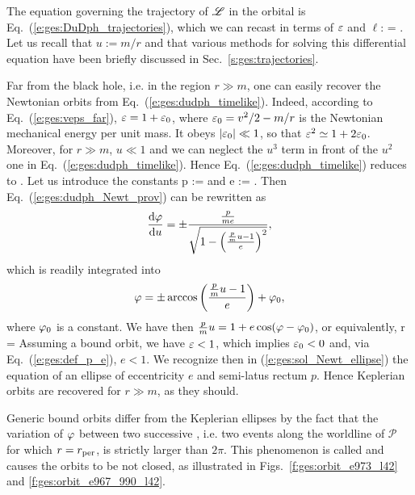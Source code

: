 The equation governing the trajectory of $\mathscr{L}$ in the orbital is
Eq.~(\ref{e:ges:DuDph_trajectories}), which we can recast in terms
of $\varepsilon$ and $\ell$:
\be  \label{e:ges:dudph_timelike}
      = \pm {} .
\ee
Let us recall that $u := m/r$ and that various methods for solving this
differential equation have been briefly discussed in Sec.~\ref{s:ges:trajectories}.

\begin{remark}
Far from the black hole, i.e. in the region $r\gg m$, one can easily recover
the Newtonian orbits from Eq.~(\ref{e:ges:dudph_timelike}). Indeed, according to
Eq.~(\ref{e:ges:veps_far}), $\varepsilon = 1 + \varepsilon_0$, where $\varepsilon_0 = v^2/2 -m/r$  is
the Newtonian mechanical energy per unit mass. It obeys $|\varepsilon_0|\ll 1$, so that $\varepsilon^2 \simeq 1 + 2\varepsilon_0$.
Moreover, for $r\gg m$, $u\ll 1$ and we can neglect the $u^3$ term in front
of the $u^2$ one in Eq.~(\ref{e:ges:dudph_timelike}). Hence Eq.~(\ref{e:ges:dudph_timelike})
reduces to
\be \label{e:ges:dudph_Newt_prov}
      \simeq \pm {} .
\ee
Let us introduce the constants
\be \label{e:ges:def_p_e}
    p :=  \qquad\mbox{and}\qquad
    e :=  .
\ee
Then Eq.~(\ref{e:ges:dudph_Newt_prov}) can be rewritten as
\[
    \frac{\mathrm{d} \varphi}{\mathrm{d} u} = \pm \frac{\frac{p}{m e}}{\sqrt{1 - \left(\frac{\frac{p}{m}u-1}{e}\right) ^2}} ,
\]
which is readily integrated into
\[
    \varphi = \pm \arccos \left(\frac{\frac{p}{m}u-1}{e}\right) + \varphi_0 ,
\]
where $\varphi_0$ is a constant. We have then $\frac{p}{m} u = 1 + e\cos(\varphi-\varphi_0)$, or
equivalently,
\be \label{e:ges:sol_Newt_ellipse}
    r = 
\ee
Assuming a bound orbit, we have $\varepsilon < 1$, which implies $\varepsilon_0 < 0$
and, via Eq.~(\ref{e:ges:def_p_e}), $e<1$. We recognize then in (\ref{e:ges:sol_Newt_ellipse}) the equation
of an ellipse of eccentricity $e$ and semi-latus rectum $p$. Hence Keplerian orbits are recovered for $r\gg m$, as they should.
\end{remark}

Generic bound orbits differ from the Keplerian ellipses by the fact that
the variation of $\varphi$ between two successive ,
i.e. two events along the worldline of $\mathscr{P}$ for which $r=r_{\rm per}$,
is strictly larger than $2\pi$. This phenomenon is called 
and causes the orbits to be not closed, as illustrated in Figs.~\ref{f:ges:orbit_e973_l42} and
\ref{f:ges:orbit_e967_990_l42}.


